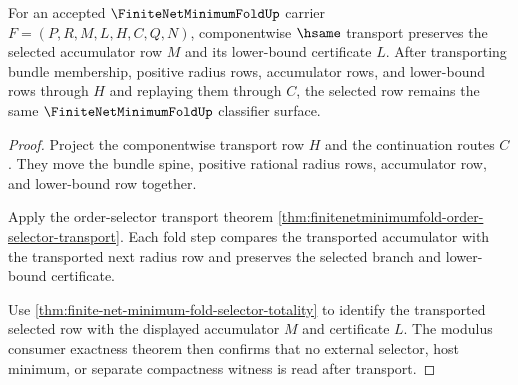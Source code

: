 \begin{theorem}
\label{thm:finite-net-minimum-fold-selector-stability}
For an accepted $\FiniteNetMinimumFoldUp$ carrier $F=(P,R,M,L,H,C,Q,N)$, componentwise $\hsame$ transport preserves the selected accumulator row $M$ and its lower-bound certificate $L$. After transporting bundle membership, positive radius rows, accumulator rows, and lower-bound rows through $H$ and replaying them through $C$, the selected row remains the same $\FiniteNetMinimumFoldUp$ classifier surface.
\end{theorem}
\begin{proof}
Project the componentwise transport row $H$ and the continuation routes $C$. They move the bundle spine, positive rational radius rows, accumulator row, and lower-bound row together.

Apply the order-selector transport theorem \autoref{thm:finitenetminimumfold-order-selector-transport}. Each fold step compares the transported accumulator with the transported next radius row and preserves the selected branch and lower-bound certificate.

Use \autoref{thm:finite-net-minimum-fold-selector-totality} to identify the transported selected row with the displayed accumulator $M$ and certificate $L$. The modulus consumer exactness theorem then confirms that no external selector, host minimum, or separate compactness witness is read after transport.
\end{proof}

